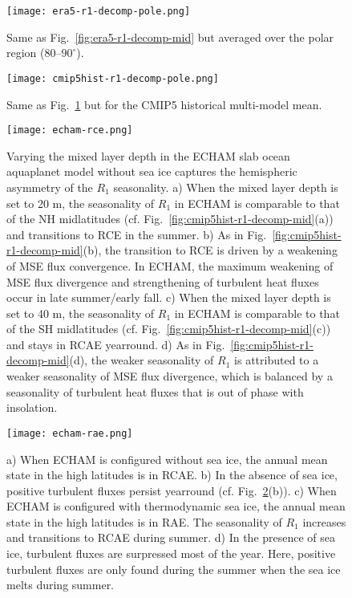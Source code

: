 \documentclass{ametsocV5}
\begin{document}
\begin{figure}[t]
  \noindent\texttt{[image: era5-r1-decomp-pole.png]}\\
  \caption{Same as Fig.~\ref{fig:era5-r1-decomp-mid} but averaged over the polar region ($80$--$90^{\circ}$).}
  \label{fig:era5-r1-decomp-pole}
\end{figure}

\begin{figure}[t]
  \noindent\texttt{[image: cmip5hist-r1-decomp-pole.png]}\\
  \caption{Same as Fig.~\ref{fig:era5-r1-decomp-pole} but for the CMIP5 historical multi-model mean.}
  \label{fig:cmip5hist-r1-decomp-pole}
\end{figure}

\begin{figure}[t]
  \noindent\texttt{[image: echam-rce.png]}\\
  \caption{Varying the mixed layer depth in the ECHAM slab ocean aquaplanet model without sea ice captures the hemispheric asymmetry of the \(R_{1}\) seasonality. a) When the mixed layer depth is set to 20 m, the seasonality of \(R_{1}\) in ECHAM is comparable to that of the NH midlatitudes (cf. Fig.~\ref{fig:cmip5hist-r1-decomp-mid}(a)) and transitions to RCE in the summer. b) As in Fig.~\ref{fig:cmip5hist-r1-decomp-mid}(b), the transition to RCE is driven by a weakening of MSE flux convergence. In ECHAM, the maximum weakening of MSE flux divergence and strengthening of turbulent heat fluxes occur in late summer/early fall. c) When the mixed layer depth is set to 40 m, the seasonality of \(R_{1}\) in ECHAM is comparable to that of the SH midlatitudes (cf. Fig.~\ref{fig:cmip5hist-r1-decomp-mid}(c)) and stays in RCAE yearround. d) As in Fig.~\ref{fig:cmip5hist-r1-decomp-mid}(d), the weaker seasonality of \(R_{1}\) is attributed to a weaker seasonality of MSE flux divergence, which is balanced by a seasonality of turbulent heat fluxes that is out of phase with insolation.}
  \label{fig:echam-rce}
\end{figure}

\begin{figure}[t]
  \noindent\texttt{[image: echam-rae.png]}\\
  \caption{a) When ECHAM is configured without sea ice, the annual mean state in the high latitudes is in RCAE. b) In the absence of sea ice, positive turbulent fluxes persist yearround (cf. Fig.~\ref{fig:cmip5hist-r1-decomp-pole}(b)). c) When ECHAM is configured with thermodynamic sea ice, the annual mean state in the high latitudes is in RAE. The seasonality of \(R_{1}\) increases and transitions to RCAE during summer. d) In the presence of sea ice, turbulent fluxes are surpressed most of the year. Here, positive turbulent fluxes are only found during the summer when the sea ice melts during summer.}
  \label{fig:echam-rae}
\end{figure}
\end{document}
